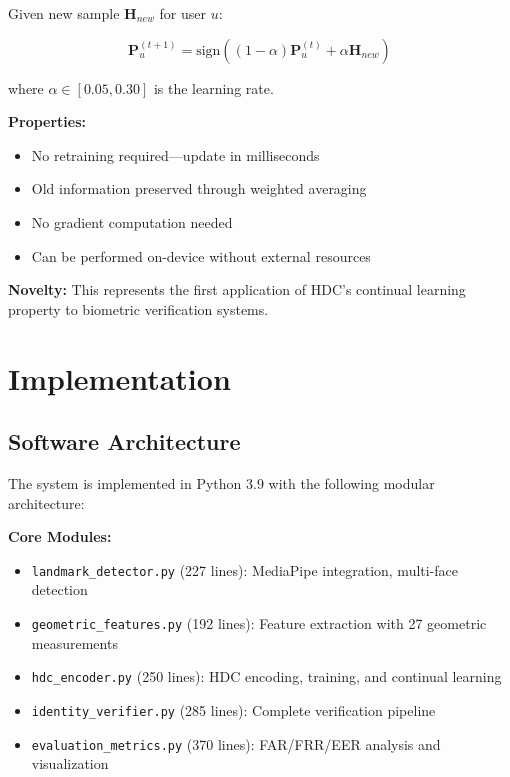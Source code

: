 \documentclass[a4paper,12pt]{article}
\begin{document}
Given new sample $\mathbf{H}_{new}$ for user $u$:

\begin{equation}
\mathbf{P}_u^{(t+1)} = \text{sign}((1-\alpha)\mathbf{P}_u^{(t)} + \alpha\mathbf{H}_{new})
\end{equation}

where $\alpha \in [0.05, 0.30]$ is the learning rate.

\textbf{Properties:}
\begin{itemize}
    \item No retraining required—update in milliseconds
    \item Old information preserved through weighted averaging
    \item No gradient computation needed
    \item Can be performed on-device without external resources
\end{itemize}

\textbf{Novelty:} This represents the first application of HDC's continual learning property to biometric verification systems.

\newpage

\section{Implementation}

\subsection{Software Architecture}

The system is implemented in Python 3.9 with the following modular architecture:

\textbf{Core Modules:}
\begin{itemize}
    \item \texttt{landmark\_detector.py} (227 lines): MediaPipe integration, multi-face detection
    \item \texttt{geometric\_features.py} (192 lines): Feature extraction with 27 geometric measurements
    \item \texttt{hdc\_encoder.py} (250 lines): HDC encoding, training, and continual learning
    \item \texttt{identity\_verifier.py} (285 lines): Complete verification pipeline
    \item \texttt{evaluation\_metrics.py} (370 lines): FAR/FRR/EER analysis and visualization
\end{itemize}
\end{document}
